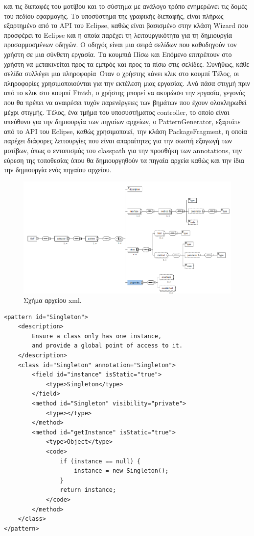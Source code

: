 και τις διεπαφές του μοτίβου και το σύστημα με ανάλογο τρόπο ενημερώνει τις δομές του πεδίου εφαρμογής. \newline \newline
Το υποσύστημα της γραφικής διεπαφής, είναι πλήρως εξαρτημένο από το API του Eclipse, καθώς είναι 
βασισμένο στην κλάση Wizard που προσφέρει το Eclipse και η οποία παρέχει τη λειτουργικότητα για τη δημιουργία 
προσαρμοσμένων οδηγών. Ο οδηγός είναι μια σειρά σελίδων που καθοδηγούν τον χρήστη σε μια σύνθετη εργασία. 
Τα κουμπιά Πίσω και Επόμενο επιτρέπουν στο χρήστη να μετακινείται προς τα εμπρός και προς τα πίσω στις σελίδες. 
Συνήθως, κάθε σελίδα συλλέγει μια πληροφορία\anotelia \  Όταν ο χρήστης κάνει κλικ στο κουμπί Τέλος, οι πληροφορίες χρησιμοποιούνται 
για την εκτέλεση μιας εργασίας. Ανά πάσα στιγμή πριν από το κλικ στο κουμπί Finish, ο χρήστης μπορεί να ακυρώσει την εργασία, 
γεγονός που θα πρέπει να αναιρέσει τυχόν παρενέργειες των βημάτων που έχουν ολοκληρωθεί μέχρι στιγμής. Τέλος, ένα τμήμα του υποσυστήματος controller, 
το οποίο είναι υπεύθυνο για την δημιουργία των πηγαίων αρχείων, ο PatternGenerator, εξαρτάτε από το API του Eclipse, καθώς χρησιμοποιεί, 
την κλάση PackageFragment, η οποία παρέχει διάφορες λειτουργίες που είναι απαραίτητες για την σωστή εξαγωγή των μοτίβων, όπως ο εντοπισμός
του classpath για την προσθήκη των annotations, την εύρεση της τοποθεσίας όπου θα δημιουργηθούν τα πηγαία αρχεία 
καθώς και την ίδια την δημιουργία ενός πηγαίου αρχείου.

\begin{figure}[H]
    \centering
    \includegraphics[width=1.0\textwidth]{Figures/xsd_diagram.png}
    \caption{Σχήμα αρχείου xml.}
    \label{fig:xsd}
\end{figure}
\newpage
\begin{lstlisting}[label=code:xml, caption=Περιγραφή μοτίβου Singleton.]
<pattern id="Singleton">
    <description>
        Ensure a class only has one instance, 
        and provide a global point of access to it.
    </description>
    <class id="Singleton" annotation="Singleton">
        <field id="instance" isStatic="true">
            <type>Singleton</type>
        </field>
        <method id="Singleton" visibility="private">
            <type></type>
        </method>
        <method id="getInstance" isStatic="true">
            <type>Object</type>
            <code>
                if (instance == null) {
                    instance = new Singleton();
                }
                return instance;
            </code>
        </method>
    </class>
</pattern>
\end{lstlisting}
